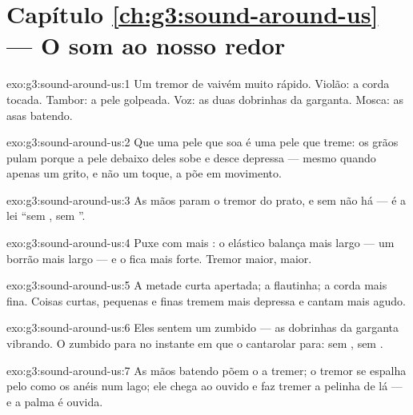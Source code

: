 \section*{Capítulo \ref{ch:g3:sound-around-us} --- O som ao nosso redor}

\begin{solution}{exo:g3:sound-around-us:1}
Um tremor de vaivém muito rápido. Violão: a corda tocada. Tambor: a
pele golpeada. Voz: as duas dobrinhas da garganta. Mosca: as asas
batendo.
\end{solution}

\begin{solution}{exo:g3:sound-around-us:2}
Que uma pele que soa é uma pele que treme: os grãos pulam porque a
pele debaixo deles sobe e desce depressa --- mesmo quando apenas um
grito, e não um toque, a põe em movimento.
\end{solution}

\begin{solution}{exo:g3:sound-around-us:3}
As mãos param o tremor do prato, e sem  não há  --- é a
lei ``sem , sem ''.
\end{solution}

\begin{solution}{exo:g3:sound-around-us:4}
Puxe com mais : o elástico balança mais largo --- um borrão mais
largo --- e o  fica mais forte. Tremor maior,  maior.
\end{solution}

\begin{solution}{exo:g3:sound-around-us:5}
A metade curta apertada; a flautinha; a corda mais fina. Coisas
curtas, pequenas e finas tremem mais depressa e cantam mais agudo.
\end{solution}

\begin{solution}{exo:g3:sound-around-us:6}
Eles sentem um zumbido --- as dobrinhas da garganta vibrando. O
zumbido para no instante em que o cantarolar para: sem , sem
.
\end{solution}

\begin{solution}{exo:g3:sound-around-us:7}
As mãos batendo põem o  a tremer; o tremor se espalha pelo  como
os anéis num lago; ele chega ao ouvido e faz tremer a pelinha de lá
--- e a palma é ouvida.
\end{solution}

